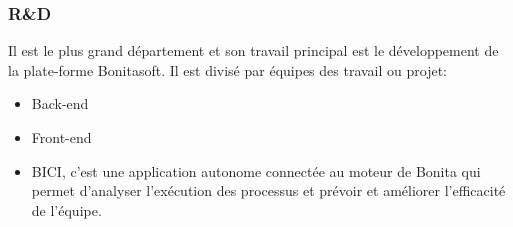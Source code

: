 \subsubsection{R\&D}
Il est le plus grand département et son travail principal est le développement de la plate-forme Bonitasoft.
Il est divisé par équipes des travail ou projet:
\begin{itemize}
  \item Back-end
  \item Front-end
  \item BICI, c'est une application autonome connectée au moteur de Bonita qui permet d'analyser l'exécution
   des processus et prévoir et améliorer l'efficacité de l'équipe.
\end{itemize}
